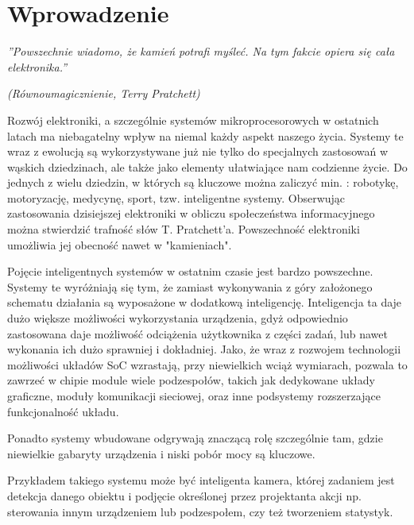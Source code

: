 
\chapter{Wprowadzenie} %
\label{ch:name} %
 
\begin{flushright}
\emph{''Powszechnie wiadomo, że kamień potrafi myśleć. Na tym fakcie opiera się cała elektronika.''}

\textit{{\footnotesize (Równoumagicznienie, Terry Pratchett)}  }
\end{flushright}


Rozwój elektroniki, a szczególnie systemów mikroprocesorowych w ostatnich latach ma niebagatelny wpływ na niemal każdy aspekt naszego życia. Systemy te wraz z ewolucją są wykorzystywane już nie tylko do specjalnych zastosowań w wąskich dziedzinach, ale także jako elementy ułatwiające nam codzienne życie. Do jednych z wielu dziedzin, w których są kluczowe można zaliczyć min. : robotykę, motoryzację, medycynę, sport, tzw. inteligentne systemy. Obserwując zastosowania dzisiejszej elektroniki w obliczu społeczeństwa informacyjnego można stwierdzić trafność słów T. Pratchett'a. Powszechność elektroniki umożliwia jej obecność nawet w "kamieniach".

Pojęcie inteligentnych systemów w ostatnim czasie jest bardzo powszechne. Systemy te wyróżniają się tym, że zamiast wykonywania z góry założonego schematu działania są wyposażone w dodatkową inteligencję. Inteligencja ta daje dużo większe możliwości wykorzystania urządzenia, gdyż odpowiednio zastosowana daje możliwość odciążenia użytkownika z części zadań, lub nawet wykonania ich dużo sprawniej i dokładniej.
Jako, że wraz z rozwojem technologii możliwości układów SoC  wzrastają, przy niewielkich wciąż wymiarach, pozwala to zawrzeć w chipie module wiele podzespołów, takich jak  dedykowane układy graficzne, moduły komunikacji sieciowej, oraz inne podsystemy rozszerzające funkcjonalność układu.

Ponadto systemy wbudowane odgrywają znaczącą rolę szczególnie tam, gdzie niewielkie gabaryty urządzenia i niski pobór mocy są kluczowe.

Przykładem takiego systemu może być inteligenta kamera, której zadaniem jest detekcja  danego obiektu i podjęcie określonej przez projektanta akcji np. sterowania innym urządzeniem lub podzespołem, czy też tworzeniem statystyk.

